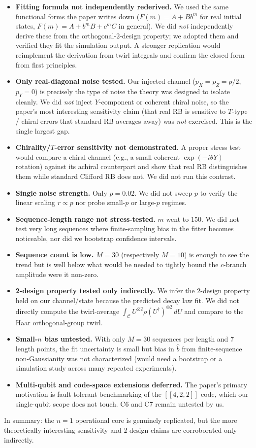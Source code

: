 \documentclass[11pt]{article}
\begin{document}
\begin{itemize}
    \item \textbf{Fitting formula not independently rederived.} We used the
    same functional forms the paper writes down
    ($F(m) = A + B b^m$ for real initial states,
    $F(m) = A + b^m B + c^m C$ in general). We did \emph{not} independently
    derive these from the orthogonal-2-design property; we adopted them and
    verified they fit the simulation output. A stronger replication would
    reimplement the derivation from twirl integrals and confirm the closed
    form from first principles.
    \item \textbf{Only real-diagonal noise tested.} Our injected channel
    ($p_X = p_Z = p/2$, $p_Y = 0$) is precisely the type of noise the theory
    was designed to isolate cleanly. We did \emph{not} inject $Y$-component or
    coherent chiral noise, so the paper's most interesting sensitivity claim
    (that real RB is sensitive to $T$-type / chiral errors that standard RB
    averages away) was \emph{not} exercised. This is the single largest gap.
    \item \textbf{Chirality/$T$-error sensitivity not demonstrated.} A proper
    stress test would compare a chiral channel (e.g., a small coherent
    $\exp(-i\theta Y)$ rotation) against its achiral counterpart and show
    that real RB distinguishes them while standard Clifford RB does not.
    We did not run this contrast.
    \item \textbf{Single noise strength.} Only $p = 0.02$. We did not sweep
    $p$ to verify the linear scaling $r \propto p$ nor probe small-$p$ or
    large-$p$ regimes.
    \item \textbf{Sequence-length range not stress-tested.} $m$ went to 150.
    We did not test very long sequences where finite-sampling bias in the
    fitter becomes noticeable, nor did we bootstrap confidence intervals.
    \item \textbf{Sequence count is low.} $M = 30$ (respectively $M = 10$)
    is enough to see the trend but is well below what would be needed to
    tightly bound the $c$-branch amplitude were it non-zero.
    \item \textbf{2-design property tested only indirectly.} We infer the
    2-design property held on our channel/state because the predicted decay
    law fit. We did not directly compute the twirl-average
    $\int_{\mathcal{C}} U^{\otimes 2} \rho (U^\dagger)^{\otimes 2}\,dU$ and
    compare to the Haar orthogonal-group twirl.
    \item \textbf{Small-$n$ bias untested.} With only $M = 30$ sequences
    per length and 7 length points, the fit uncertainty is small but bias
    in $\hat b$ from finite-sequence non-Gaussianity was not characterized
    (would need a bootstrap or a simulation study across many repeated
    experiments).
    \item \textbf{Multi-qubit and code-space extensions deferred.} The
    paper's primary motivation is fault-tolerant benchmarking of the
    $[[4,2,2]]$ code, which our single-qubit scope does not touch. C6 and
    C7 remain untested by us.
\end{itemize}

In summary: the $n=1$ operational core is genuinely replicated, but the more
theoretically interesting sensitivity and 2-design claims are corroborated
only indirectly.


\end{document}
